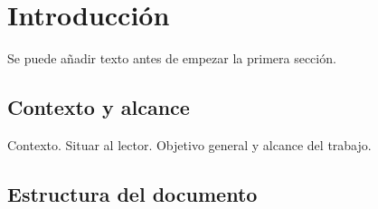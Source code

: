 \documentclass[12pt,twoside,titlepage]{report}
\begin{document}







\pagestyle{fancy}


\renewcommand{\chaptermark}[1]{\markboth{Capítulo \thechapter.\ #1}{}}

\pagestyle{fancy}
\fancyhf{}
\fancyhead[LO]{\leftmark}
\fancyhead[RO]{}
\fancyhead[RE]{\nouppercase\rightmark}
\fancyhead[LE]{}
\fancyfoot[C]{\thepage}










\chapter{Introducción}
\newpage


\pagestyle{fancy}


\setlength{\parskip}{0.75em}
\renewcommand{\baselinestretch}{1.25}
\setcounter{page}{1}




Se puede añadir texto antes de empezar la primera sección.


\section{Contexto y alcance}

Contexto. Situar al lector. Objetivo general y alcance del trabajo.


\section{Estructura del documento}
\end{document}
